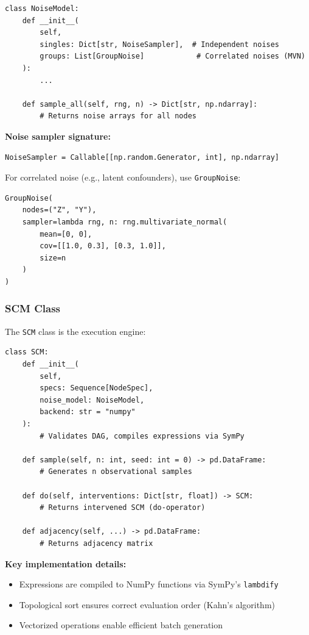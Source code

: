 \documentclass[11pt,a4paper]{article}
\begin{document}
\begin{lstlisting}[caption={NoiseModel Interface}]
class NoiseModel:
    def __init__(
        self,
        singles: Dict[str, NoiseSampler],  # Independent noises
        groups: List[GroupNoise]            # Correlated noises (MVN)
    ):
        ...

    def sample_all(self, rng, n) -> Dict[str, np.ndarray]:
        # Returns noise arrays for all nodes
\end{lstlisting}

\textbf{Noise sampler signature:}
\begin{lstlisting}
NoiseSampler = Callable[[np.random.Generator, int], np.ndarray]
\end{lstlisting}

For correlated noise (e.g., latent confounders), use \texttt{GroupNoise}:
\begin{lstlisting}
GroupNoise(
    nodes=("Z", "Y"),
    sampler=lambda rng, n: rng.multivariate_normal(
        mean=[0, 0],
        cov=[[1.0, 0.3], [0.3, 1.0]],
        size=n
    )
)
\end{lstlisting}

\subsubsection{SCM Class}

The \texttt{SCM} class is the execution engine:

\begin{lstlisting}[caption={SCM Core Methods}]
class SCM:
    def __init__(
        self,
        specs: Sequence[NodeSpec],
        noise_model: NoiseModel,
        backend: str = "numpy"
    ):
        # Validates DAG, compiles expressions via SymPy

    def sample(self, n: int, seed: int = 0) -> pd.DataFrame:
        # Generates n observational samples

    def do(self, interventions: Dict[str, float]) -> SCM:
        # Returns intervened SCM (do-operator)

    def adjacency(self, ...) -> pd.DataFrame:
        # Returns adjacency matrix
\end{lstlisting}

\textbf{Key implementation details:}
\begin{itemize}
    \item Expressions are compiled to NumPy functions via SymPy's \texttt{lambdify}
    \item Topological sort ensures correct evaluation order (Kahn's algorithm)
    \item Vectorized operations enable efficient batch generation
\end{itemize}
\end{document}
